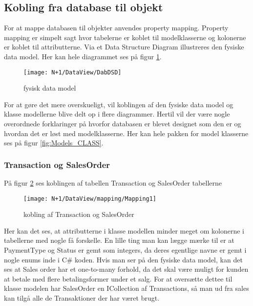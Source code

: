\subsection{Kobling fra database til objekt}
For at mappe databasen til objekter anvendes property mapping. Property mapping er simpelt sagt hvor tabelerne er koblet til modelklasserne og kolonerne er koblet til attributterne. Via et Data Structure Diagram illustreres den fysiske data model. Her kan hele diagrammet ses på figur \ref{fig:DSD}.

\begin{figure}[H]
    \centering
    \texttt{[image: N+1/DataView/DabDSD]}
    \caption{fysisk data model}
    \label{fig:DSD}
\end{figure}

For at gøre det mere overskueligt, vil koblingen af den fysiske data model og klasse modellerne blive delt op i flere diagrammer. Hertil vil der være nogle overordnede forklaringer på hvorfor databasen er blevet designet som den er og hvordan det er løst med modelklasserne. Her kan hele pakken for model klasserne ses på figur \ref{fig:Models_CLASS}.

\subsubsection{Transaction og SalesOrder}
På figur \ref{fig:Mapping_TS} ses koblingen af tabellen Transaction og SalesOrder tabellerne

\begin{figure}[H]
    \centering
    \texttt{[image: N+1/DataView/mapping/Mapping1]}
    \caption{kobling af Transaction og SalesOrder}
    \label{fig:Mapping_TS}
\end{figure}

Her kan det ses, at attributterne i klasse modellen minder meget om kolonerne i tabellerne med nogle få forskelle. En lille ting man kan lægge mærke til er at PaymentType og Status er gemt som integers, da deres egentlige navne er gemt i nogle enums inde i C\# koden. 
\newline\newline
Hvis man ser på den fysiske data model, kan det ses at Sales order har et one-to-many forhold, da det skal være muligt for kunden at betale med flere betalingsformer under et salg. For at oversætte dettee til klasse modelen har SalesOrder en ICollection af Transactions, så man ud fra sales kan tilgå alle de Transaktioner der har været brugt. 

